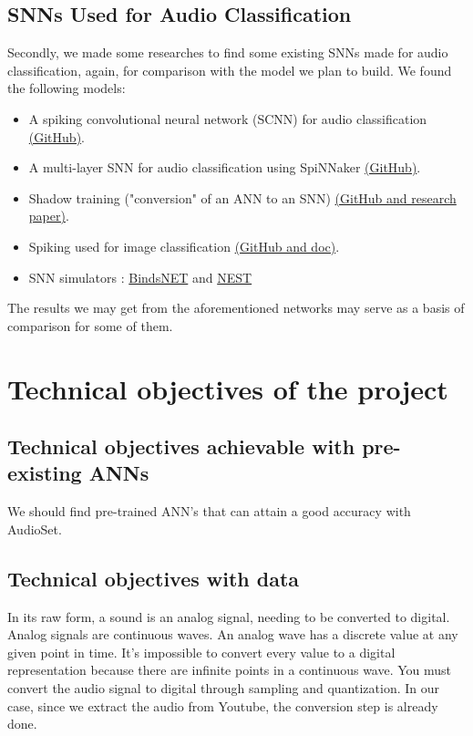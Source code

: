\documentclass[11pt]{article}
\begin{document}
\subsection{SNNs Used for Audio Classification}

Secondly, we made some researches to find some existing SNNs made for audio classification, again, for comparison with the model we plan to build.
We found the following models:
\begin{itemize}
  \item A spiking convolutional neural network (SCNN) for audio classification \hyperref[item:SCNN-audio-classification]{(GitHub)}.
  \item A multi-layer SNN for audio classification using SpiNNaker \hyperref[item:spinnaker-audio-classification]{(GitHub)}.
  \item Shadow training ("conversion" of an ANN to an SNN) \hyperref[item:shadow-training]{(GitHub and research paper)}.
  \item Spiking used for image classification \hyperref[item:stereospike]{(GitHub and doc)}.
  \item SNN simulators : \href{item:bindsNET_snntorch-lib}{BindsNET} and \href{item:nest_snntorch-lib}{NEST}
\end{itemize}

The results we may get from the aforementioned networks may serve as a basis of comparison for some of them.


\section{Technical objectives of the project}
\subsection{Technical objectives achievable with pre-existing ANNs}

We should find pre-trained ANN's that can attain a good accuracy with AudioSet.

\subsection{Technical objectives with data}

  In its raw form, a sound is an analog signal, needing to be converted to digital. Analog signals are continuous waves. An analog wave has a discrete value at any given point in time. It’s impossible to convert every value to a digital representation because there are infinite points in a continuous wave. You must convert the audio signal to digital through sampling and quantization. In our case, since we extract the audio from Youtube, the conversion step is already done.
\end{document}
